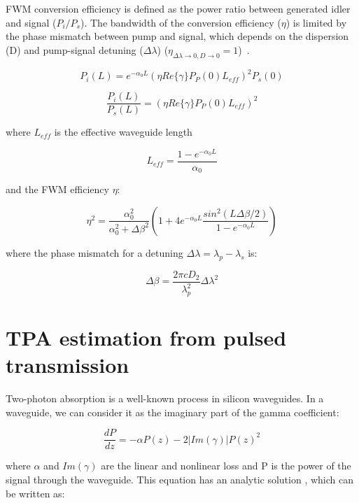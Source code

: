 FWM conversion efficiency is defined as the power ratio between generated idler and signal ($P_i/P_s$).
The bandwidth of the conversion efficiency ($\eta$) is limited by the phase mismatch between pump and signal, which depends on the dispersion (D) and pump-signal detuning ($\Delta \lambda$) ($ \eta_{\Delta\lambda \to 0,D \to 0} = 1 $)~\cite{Vallaitis2009}.


\begin{equation}
	P_i(L)=e^{-\alpha_0L}(\eta Re\{\gamma\}P_P(0)L_{eff})^2 P_s(0)
\end{equation}

\begin{equation}
	\frac{P_i(L)}{P_s(L)}=(\eta Re\{\gamma\}P_P(0)L_{eff})^2 
\label{eq:ratio}
\end{equation}

where $ L_{eff} $ is the effective waveguide length

\begin{equation}
	L_{eff}=\frac{1-e^{-\alpha_0L}}{\alpha_0}
\end{equation}

and the FWM efficiency $ \eta $:

\begin{equation}
	\eta ^2=\frac{\alpha_0^2}{\alpha_0^2+\Delta \beta^2}\left( 1+ 4e^{-\alpha_0L}\frac{sin^2(L\Delta\beta/2)}{1-e^{-\alpha_0L}} \right)
\end{equation}

where the phase mismatch for a detuning $ \Delta\lambda = \lambda_p-\lambda_s$ is:

\begin{equation}
	\Delta \beta=\frac{2\pi cD_2}{\lambda_p^2}\Delta\lambda^2
\end{equation}



\section{TPA estimation from pulsed transmission}
\label{ch:imGamma}
Two-photon absorption is a well-known process in silicon waveguides.
In a waveguide, we can consider it as the imaginary part of the gamma coefficient:

\begin{equation}
 \frac{dP}{dz} = -\alpha P(z) - 2|Im(\gamma)| P(z)^2 
\label{eq:differentialTPAImGamma}
\end{equation}

where $\alpha$ and $Im(\gamma)$ are the linear and nonlinear loss and P is the power of the signal through the waveguide.
This equation has an analytic solution \cite{Koos2007,Tsang1991}, which can be written as:

